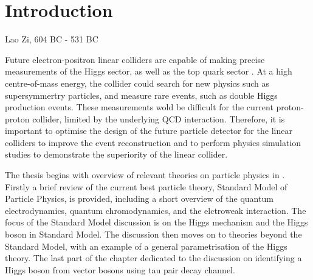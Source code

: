 \chapter{Introduction}
\label{chap:Introduction}



%
{Lao Zi, 604 BC - 531 BC}%



Future electron-positron linear colliders are capable of making precise measurements of the Higgs sector, as well as the top quark sector \cite{Brau:2007zza,Linssen:2012hp}. At a high centre-of-mass energy, the collider could search for new physics such as supersymmertry particles, and  measure rare events, such as double Higgs production events. These measurements wold be difficult for the current proton-proton collider, limited by the underlying QCD interaction. Therefore, it is important to optimise the design of the future particle detector for the linear colliders to improve the event reconstruction and to perform physics simulation studies to demonstrate the superiority of the linear collider.



The thesis begins with overview of relevant theories on particle physics in .  Firstly a brief review of the   current best particle theory, Standard Model of Particle Physics, is provided, including a short overview of the quantum electrodynamics, quantum chromodynamics, and the elctroweak interaction. The focus of the Standard Model discussion is on the  Higgs mechanism and the Higgs boson in Standard Model. The discussion then moves on to theories beyond the Standard Model, with an example of   a general parametrisation of the Higgs theory. The last part of the chapter dedicated to the discussion on identifying a Higgs boson from vector bosons using tau pair decay channel.


